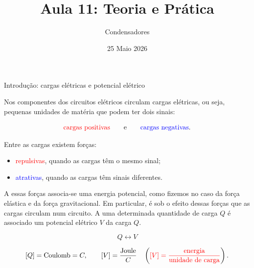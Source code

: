 \documentclass{beamer}
\title{Aula 11: Teoria e Prática}
\subtitle{Condensadores}
\date{25 Maio 2026}
\begin{document}
	
	\frame{\titlepage}
	
	\begin{frame}{Introdução: cargas elétricas e potencial elétrico}
		\scriptsize
		
		Nos componentes dos circuitos elétricos circulam cargas elétricas, ou seja,
		pequenas unidades de matéria que podem ter dois sinais:
		
		\[
		\textcolor{red}{\text{cargas positivas}}
		\qquad \text{e} \qquad
		\textcolor{blue}{\text{cargas negativas}}.
		\]
		
		Entre as cargas existem forças:
		
		\begin{itemize}
			\item \textcolor{red}{repulsivas}, quando as cargas têm o mesmo sinal;
			\item \textcolor{blue}{atrativas}, quando as cargas têm sinais diferentes.
		\end{itemize}
		
		A essas forças associa-se uma energia potencial, como fizemos no caso
		da força elástica e da força gravitacional.
		Em particular, é sob o efeito dessas forças que as cargas circulam num circuito.
		A uma determinada quantidade de carga \(Q\) é associado um potencial elétrico
		\(V\) da carga \(Q\).
		
		\[
		Q \longleftrightarrow V
		\]
		
		\[
		[Q]=\text{Coulomb}=C,
		\qquad
		[V]=\frac{\text{Joule}}{C}
		\quad
		\left(
		\textcolor{red}{[V]=\frac{\text{energia}}{\text{unidade de carga}}}
		\right).
		\]
	\end{frame}
	
\end{document}

